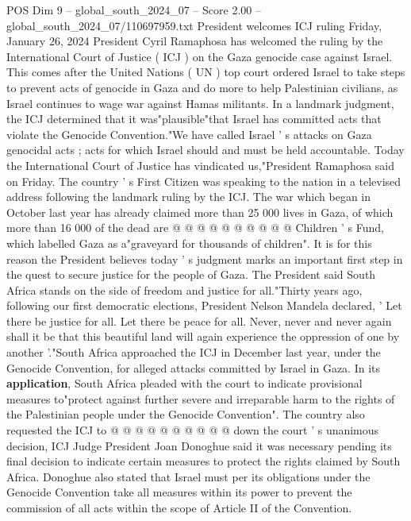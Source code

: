 \begin{textsample}{POS Dim 9 – global\_south\_2024\_07 – Score 2.00 – global\_south\_2024\_07/110697959.txt}  \label{ex:f9_pos_110}
President welcomes ICJ ruling Friday, January 26, 2024 President Cyril Ramaphosa has welcomed the ruling by the International Court of Justice ( ICJ ) on the Gaza genocide case against Israel.
This comes after the United Nations ( UN ) top court ordered Israel to take steps to prevent acts of genocide in Gaza and do more to help Palestinian civilians, as Israel continues to wage war against Hamas militants.
In a landmark judgment, the ICJ determined that it was"plausible"that Israel has committed acts that violate the Genocide Convention."We have called Israel ' s attacks on Gaza genocidal acts ; acts for which Israel should and must be held accountable.
Today the International Court of Justice has vindicated us,"President Ramaphosa said on Friday.
The country ' s First Citizen was speaking to the nation in a televised address following the landmark ruling by the ICJ.
The war which began in October last year has already claimed more than 25 000 lives in Gaza, of which more than 16 000 of the dead are @ @ @ @ @ @ @ @ @ @ Children ' s Fund, which labelled Gaza as a"graveyard for thousands of children".
It is for this reason the President believes today ' s judgment marks an important first step in the quest to secure justice for the people of Gaza.
The President said South Africa stands on the side of freedom and justice for all."Thirty years ago, following our first democratic elections, President Nelson Mandela declared, ' Let there be justice for all.
Let there be peace for all.
Never, never and never again shall it be that this beautiful land will again experience the oppression of one by another '."South Africa approached the ICJ in December last year, under the Genocide Convention, for alleged attacks committed by Israel in Gaza.
In its \textbf{application}, South Africa pleaded with the court to indicate provisional measures to"protect against further severe and irreparable harm to the rights of the Palestinian people under the Genocide Convention".
The country also requested the ICJ to @ @ @ @ @ @ @ @ @ @ down the court ' s unanimous decision, ICJ Judge President Joan Donoghue said it was necessary pending its final decision to indicate certain measures to protect the rights claimed by South Africa.
Donoghue also stated that Israel must per its obligations under the Genocide Convention take all measures within its power to prevent the commission of all acts within the scope of Article II of the Convention.

\end{textsample}
